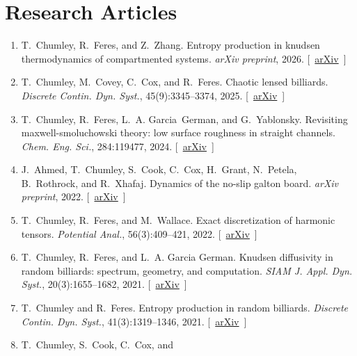 \documentclass[10pt,letterpaper]{article}
\providecommand{\tightlist}{%
  \setlength{\itemsep}{0pt}\setlength{\parskip}{0pt}}
\let\tightlist\relax
\begin{document}
\hypertarget{research-articles}{%
\section*{Research Articles}\label{research-articles}}

\begin{enumerate}
\def\labelenumi{\arabic{enumi}.}
\tightlist
\item
  \protect\hypertarget{CFZ2026}{}{} T.~Chumley, R.~Feres, and Z.~Zhang.
  Entropy production in knudsen thermodynamics of compartmented systems.
  \emph{arXiv preprint}, 2026.
  {[}~\href{http://arxiv.org/abs/2607.18202}{arXiv}~{]}
\item
  \protect\hypertarget{MR4893143}{}{} T.~Chumley, M.~Covey, C.~Cox, and
  R.~Feres. Chaotic lensed billiards. \emph{Discrete Contin. Dyn.
  Syst.}, 45(9):3345--3374, 2025.
  {[}~\href{http://arxiv.org/abs/2211.14199}{arXiv}~{]}
\item
  \protect\hypertarget{CFGY2023}{}{} T.~Chumley, R.~Feres, L.~A.
  Garcia~German, and G.~Yablonsky. Revisiting maxwell-smoluchowski
  theory: low surface roughness in straight channels. \emph{Chem. Eng.
  Sci.}, 284:119477, 2024.
  {[}~\href{http://arxiv.org/abs/2306.13018}{arXiv}~{]}
\item
  \protect\hypertarget{ACCCGPRX2022}{}{} J.~Ahmed, T.~Chumley, S.~Cook,
  C.~Cox, H.~Grant, N.~Petela, B.~Rothrock, and R.~Xhafaj. Dynamics of
  the no-slip galton board. \emph{arXiv preprint}, 2022.
  {[}~\href{http://arxiv.org/abs/2208.07790}{arXiv}~{]}
\item
  \protect\hypertarget{CFW2016}{}{} T.~Chumley, R.~Feres, and
  M.~Wallace. Exact discretization of harmonic tensors. \emph{Potential
  Anal.}, 56(3):409--421, 2022.
  {[}~\href{http://arxiv.org/abs/1603.08566}{arXiv}~{]}
\item
  \protect\hypertarget{CFG2020}{}{} T.~Chumley, R.~Feres, and L.~A.
  Garcia German. Knudsen diffusivity in random billiards: spectrum,
  geometry, and computation. \emph{SIAM J. Appl. Dyn. Syst.},
  20(3):1655--1682, 2021.
  {[}~\href{http://arxiv.org/abs/2005.14318}{arXiv}~{]}
\item
  \protect\hypertarget{CF2019}{}{} T.~Chumley and R.~Feres. Entropy
  production in random billiards. \emph{Discrete Contin. Dyn. Syst.},
  41(3):1319--1346, 2021.
  {[}~\href{http://arxiv.org/abs/1904.08924}{arXiv}~{]}
\item
  \protect\hypertarget{CCCF2018}{}{} T.~Chumley, S.~Cook, C.~Cox, and

\end{enumerate}
\end{document}

